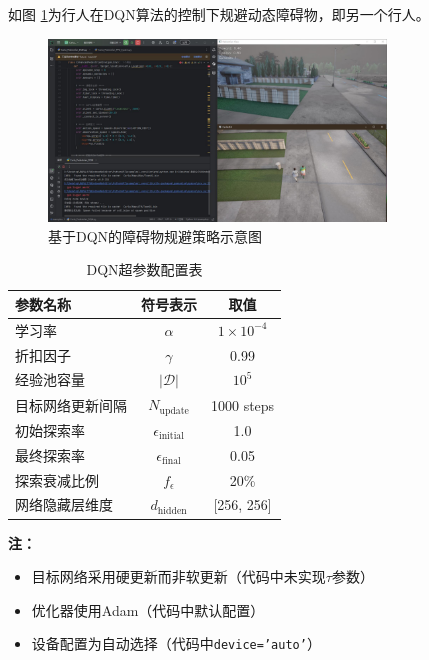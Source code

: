 如图 \ref{fig:avoidance}为行人在DQN算法的控制下规避动态障碍物，即另一个行人。

\begin{figure}[H]
    \centering
    \includegraphics[width=0.8\textwidth]{images/pedestrian_avoidance.pdf}
    \caption{基于DQN的障碍物规避策略示意图}
    \label{fig:avoidance}
\end{figure}

\begin{table}[!ht]
    \centering
    \caption{DQN超参数配置表}
    \label{tab:dqn_params}
    \begin{tabular}{lcc}
        \toprule
        参数名称 & 符号表示 & 取值 \\
        \midrule
        学习率 & $\alpha$ & $1\times10^{-4}$ \\
        折扣因子 & $\gamma$ & 0.99 \\
        经验池容量 & $|\mathcal{D}|$ & $10^5$ \\
        目标网络更新间隔 & $N_{\text{update}}$ & 1000 steps \\
        初始探索率 & $\epsilon_{\text{initial}}$ & 1.0 \\
        最终探索率 & $\epsilon_{\text{final}}$ & 0.05 \\
        探索衰减比例 & $f_{\epsilon}$ & 20\% \\  %
        网络隐藏层维度 & $d_{\text{hidden}}$ & [256, 256] \\
        \bottomrule
    \end{tabular}
\end{table}

\noindent \textbf{注：}
\begin{itemize}
    \item 目标网络采用硬更新而非软更新（代码中未实现$\tau$参数）
    \item 优化器使用Adam（代码中默认配置）
    \item 设备配置为自动选择（代码中\texttt{device='auto'}）
\end{itemize}

